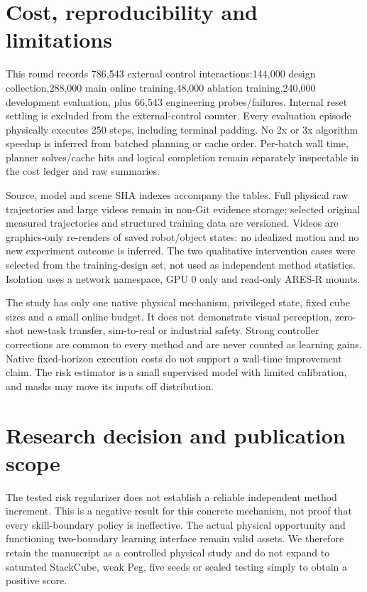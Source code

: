 \documentclass[10pt]{article}
\begin{document}
\section{Cost, reproducibility and limitations}
This round records 786,543 external control interactions:144,000 design collection,288,000 main online training,48,000 ablation training,240,000 development evaluation, plus 66,543 engineering probes/failures. Internal reset settling is excluded from the external-control counter. Every evaluation episode physically executes 250 steps, including terminal padding. No 2x or 3x algorithm speedup is inferred from batched planning or cache order. Per-batch wall time, planner solves/cache hits and logical completion remain separately inspectable in the cost ledger and raw summaries.

Source, model and scene SHA indexes accompany the tables. Full physical raw trajectories and large videos remain in non-Git evidence storage; selected original measured trajectories and structured training data are versioned. Videos are graphics-only re-renders of saved robot/object states: no idealized motion and no new experiment outcome is inferred. The two qualitative intervention cases were selected from the training-design set, not used as independent method statistics. Isolation uses a network namespace, GPU 0 only and read-only ARES-R mounts.

The study has only one native physical mechanism, privileged state, fixed cube sizes and a small online budget. It does not demonstrate visual perception, zero-shot new-task transfer, sim-to-real or industrial safety. Strong controller corrections are common to every method and are never counted as learning gains. Native fixed-horizon execution costs do not support a wall-time improvement claim. The risk estimator is a small supervised model with limited calibration, and masks may move its inputs off distribution.
\section{Research decision and publication scope}
The tested risk regularizer does not establish a reliable independent method increment. This is a negative result for this concrete mechanism, not proof that every skill-boundary policy is ineffective. The actual physical opportunity and functioning two-boundary learning interface remain valid assets. We therefore retain the manuscript as a controlled physical study and do not expand to saturated StackCube, weak Peg, five seeds or sealed testing simply to obtain a positive score.
\end{document}
